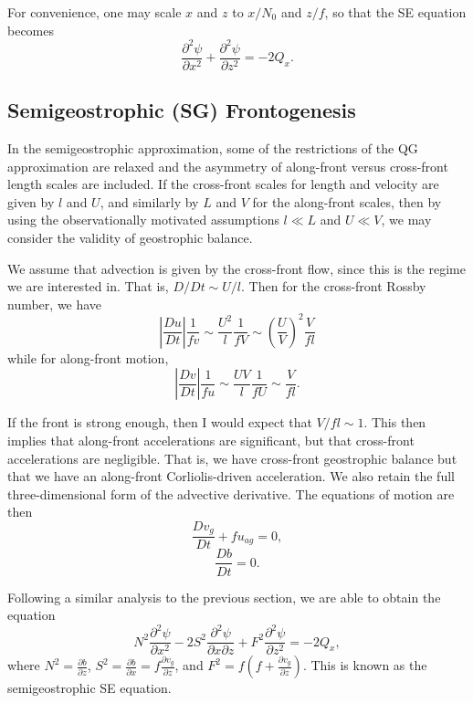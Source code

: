 \documentclass[11pt,onecolumn,oneside]{article}
\newcommand{\pdiff}[2]{\frac{\partial #1}{\partial #2}}
\begin{document}
For convenience, one may scale $x$ and $z$ to $x/N_0$ and $z/f$, so that the SE equation becomes
\[
\pdiff{^2 \psi}{x^2} + \pdiff{^2 \psi}{z^2} = -2Q_x.
\]


\subsection{Semigeostrophic (SG) Frontogenesis}

In the semigeostrophic approximation, some of the restrictions of the QG approximation are relaxed and the asymmetry of along-front versus cross-front length scales are included. If the cross-front scales for length and velocity are given by $l$ and $U$, and similarly by $L$ and $V$ for the along-front scales, then by using the observationally motivated assumptions $l \ll L$ and $U \ll V$, we may consider the validity of geostrophic balance.

We assume that advection is given by the cross-front flow, since this is the regime we are interested in. That is, $D/Dt \sim U/l$. Then for the cross-front Rossby number, we have
\[
\left|\frac{Du}{Dt}\right| \frac{1}{fv} \sim \frac{U^2}{l} \frac{1}{fV} \sim \left(\frac{U}{V}\right)^2 \frac{V}{fl}
\]
while for along-front motion,
\[
\left|\frac{Dv}{Dt}\right| \frac{1}{fu} \sim \frac{UV}{l} \frac{1}{fU} \sim \frac{V}{fl}.
\]

If the front is strong enough, then I would expect that $V/fl \sim 1$. This then implies that along-front accelerations are significant, but that cross-front accelerations are negligible. That is, we have cross-front geostrophic balance but that we have an along-front Corliolis-driven acceleration. We also retain the full three-dimensional form of the advective derivative. The equations of motion are then
\begin{equation}
\frac{Dv_g}{Dt} + f u_{ag} = 0,
\end{equation}
\begin{equation}
\frac{Db}{Dt} = 0.
\end{equation}

Following a similar analysis to the previous section, we are able to obtain the equation
\begin{equation}
N^2 \pdiff{^2 \psi}{x^2} - 2 S^2 \pdiff{^2 \psi}{x \partial z} + F^2 \pdiff{^2 \psi}{z^2} = -2Q_x,
\end{equation}
where $N^2 = \pdiff{b}{z}$, $S^2 = \pdiff{b}{x} = f \pdiff{v_g}{z}$, and $F^2 = f\left(f + \pdiff{v_g}{z}\right)$. This is known as the semigeostrophic SE equation.
\end{document}
